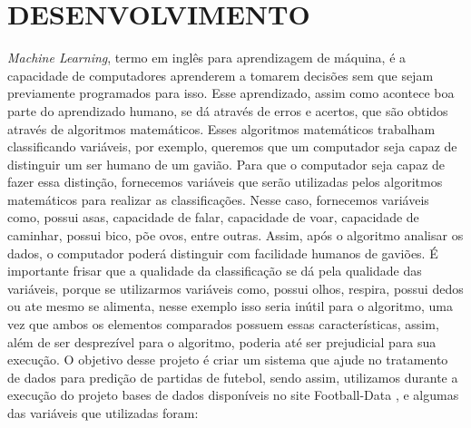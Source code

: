 \section{DESENVOLVIMENTO}
\textit{Machine Learning}, termo em inglês para aprendizagem de máquina, é a capacidade de computadores aprenderem a tomarem decisões sem que sejam previamente programados para isso. Esse aprendizado, assim como acontece boa parte do aprendizado humano, se dá através de erros e acertos, que são obtidos através de algoritmos matemáticos. Esses algoritmos matemáticos trabalham classificando variáveis, por exemplo, queremos que um computador seja capaz de distinguir um ser humano de um gavião. Para que o computador seja capaz de fazer essa distinção, fornecemos variáveis que serão utilizadas pelos algoritmos matemáticos para realizar as classificações. Nesse caso, fornecemos variáveis como, possui asas, capacidade de falar, capacidade de voar, capacidade de caminhar, possui bico, põe ovos, entre outras. Assim, após o algoritmo analisar os dados, o computador poderá distinguir com facilidade humanos de gaviões. 
É importante frisar que a qualidade da classificação se dá pela qualidade das variáveis, porque se utilizarmos variáveis como, possui olhos, respira, possui dedos ou ate mesmo se alimenta, nesse exemplo isso seria inútil para o algoritmo, uma vez que ambos os elementos comparados possuem essas características, assim, além de ser desprezível para o algoritmo, poderia até ser prejudicial para sua execução. 
O objetivo desse projeto é criar um sistema que ajude no tratamento de dados para predição de partidas de futebol, sendo assim, utilizamos durante a execução do projeto bases de dados disponíveis no site Football-Data \cite{FootballData2019}, e algumas das variáveis que utilizadas foram:
